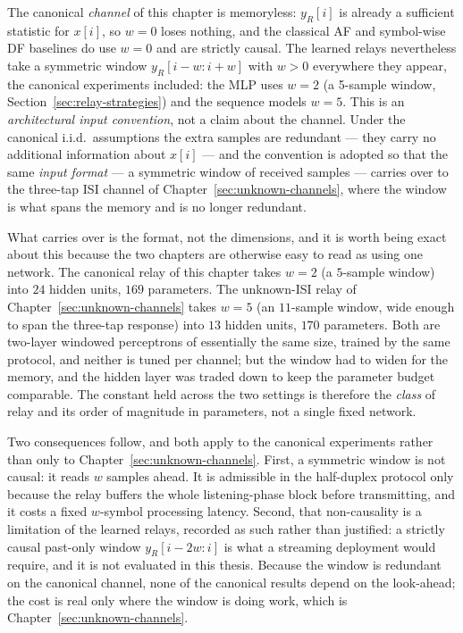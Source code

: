 \begin{remark}\label{rem:window-causality}
The canonical \emph{channel} of this chapter is memoryless: $y_R[i]$ is already a sufficient statistic for $x[i]$, so $w=0$ loses nothing, and the classical AF and symbol-wise DF baselines do use $w=0$ and are strictly causal. The learned relays nevertheless take a symmetric window $y_R[i-w:i+w]$ with $w>0$ everywhere they appear, the canonical experiments included: the MLP uses $w=2$ (a 5-sample window, Section~\ref{sec:relay-strategies}) and the sequence models $w=5$. This is an \emph{architectural input convention}, not a claim about the channel. Under the canonical i.i.d.\ assumptions the extra samples are redundant --- they carry no additional information about $x[i]$ --- and the convention is adopted so that the same \emph{input format} --- a symmetric window of received samples --- carries over to the three-tap ISI channel of Chapter~\ref{sec:unknown-channels}, where the window is what spans the memory and is no longer redundant.

What carries over is the format, not the dimensions, and it is worth being exact about this because the two chapters are otherwise easy to read as using one network. The canonical relay of this chapter takes $w=2$ (a $5$-sample window) into $24$ hidden units, $169$ parameters. The unknown-ISI relay of Chapter~\ref{sec:unknown-channels} takes $w=5$ (an $11$-sample window, wide enough to span the three-tap response) into $13$ hidden units, $170$ parameters. Both are two-layer windowed perceptrons of essentially the same size, trained by the same protocol, and neither is tuned per channel; but the window had to widen for the memory, and the hidden layer was traded down to keep the parameter budget comparable. The constant held across the two settings is therefore the \emph{class} of relay and its order of magnitude in parameters, not a single fixed network.

Two consequences follow, and both apply to the canonical experiments rather than only to Chapter~\ref{sec:unknown-channels}. First, a symmetric window is not causal: it reads $w$ samples ahead. It is admissible in the half-duplex protocol only because the relay buffers the whole listening-phase block before transmitting, and it costs a fixed $w$-symbol processing latency. Second, that non-causality is a limitation of the learned relays, recorded as such rather than justified: a strictly causal past-only window $y_R[i-2w:i]$ is what a streaming deployment would require, and it is not evaluated in this thesis. Because the window is redundant on the canonical channel, none of the canonical results depend on the look-ahead; the cost is real only where the window is doing work, which is Chapter~\ref{sec:unknown-channels}.
\end{remark}


